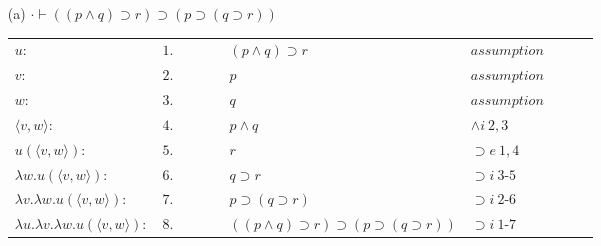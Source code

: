 \documentclass[11pt,a4paper]{article}
\begin{document}
\begin{itemize}
\item[(a)]
$\cdot \vdash ((p \wedge q) \supset r) \supset (p \supset (q \supset r))$
		\begin{table}[H]
		\centering
		\begin{tabular}{*{10}{l}}
			
			\cline{3-10}
			
			$u:$ & $1.$ &\multicolumn{1}{|c}{} & & & $(p \land q) \supset r$ & $assumption$ & & &\multicolumn{1}{c|}{}\\
			
			\cline{4-9}
			
		 	$v:$ & $2.$ & \multicolumn{1}{|c}{} & \multicolumn{1}{|c}{} &  & $p$ & $assumption$ & & \multicolumn{1}{c|}{} &\multicolumn{1}{c|}{}\\
			
			\cline{5-7}
			
			$w:$ & $3.$ & \multicolumn{1}{|c}{} & \multicolumn{1}{|c}{} & \multicolumn{1}{|c}{} & $q$ & $assumption$ & \multicolumn{1}{|c}{} & \multicolumn{1}{c|}{} &\multicolumn{1}{c|}{}\\
			
			$\langle v, w \rangle:$ & $4.$ & \multicolumn{1}{|c}{} & \multicolumn{1}{|c}{} & \multicolumn{1}{|c}{} & $p \land q$ & $\land i \ 2, 3$ & \multicolumn{1}{|c}{} & \multicolumn{1}{c|}{} & \multicolumn{1}{c|}{}\\
			
			$u(\langle v, w \rangle):$ & $5.$ & \multicolumn{1}{|c}{} & \multicolumn{1}{|c}{} & \multicolumn{1}{|c}{} & $r$ & $\supset e \ 1, 4$ & \multicolumn{1}{|c}{} & \multicolumn{1}{c|}{} & \multicolumn{1}{c|}{}\\
			
			\cline{5-7}
			
			$\lambda w . u(\langle v, w \rangle):$ & $6.$ & \multicolumn{1}{|c}{} & \multicolumn{1}{|c}{} & & $q \supset r$ & $\supset i \ 3$-$5$ & & \multicolumn{1}{c|}{} & \multicolumn{1}{c|}{}\\
			
			\cline{4-9}
			
			$\lambda v . \lambda w . u(\langle v, w \rangle):$ & $7.$ & \multicolumn{1}{|c}{} & & & $p \supset (q \supset r)$ & $\supset i \ 2$-$6$ & & & \multicolumn{1}{c|}{}\\			
			\cline{3-10}
			
			$\lambda u .\lambda v . \lambda w . u(\langle v, w \rangle): $ & $8.$ & & & & $((p \wedge q) \supset r) \supset (p \supset (q \supset r))$ & $\supset i \ 1$-$7$ & & & 
			

\end{tabular}
\end{table}
\end{itemize}
\end{document}

